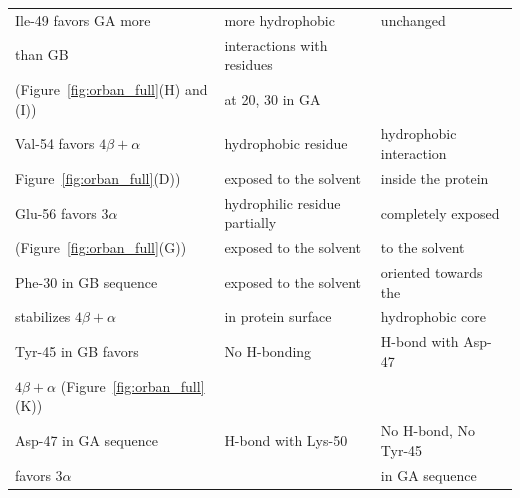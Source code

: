\documentclass[12pt]{article}
\begin{document}
\begin{table}
\begin{center}
\begin{tabular}{| l | l | l |}
    Ile-49 favors GA more                      & more hydrophobic               &  unchanged                                              \\
    than GB                                    & interactions with residues     &                                                         \\ 
    (Figure~\ref{fig:orban_full}(H) and (I))  &  at 20, 30 in GA                &                                                         \\ \hline
    Val-54 favors $4 \beta + \alpha$           & hydrophobic residue            & hydrophobic interaction                                \\
    Figure~\ref{fig:orban_full}(D))             & exposed to the solvent        & inside the protein                                      \\ \hline
    Glu-56 favors $3 \alpha$                   & hydrophilic residue partially  & completely exposed                                    \\
    (Figure~\ref{fig:orban_full}(G))            & exposed to the solvent         & to the solvent                                        \\ \hline
    Phe-30 in GB sequence                      & exposed to the solvent         & oriented towards the                                  \\
    stabilizes $4 \beta + \alpha$                  & in protein surface             & hydrophobic core                                      \\ \hline   
    Tyr-45 in GB favors                      & No H-bonding                   & H-bond with Asp-47                                    \\  
    $4 \beta + \alpha$ (Figure~\ref{fig:orban_full}(K))&                 &                                                       \\ \hline
    Asp-47 in GA sequence                      & H-bond with Lys-50             & No H-bond, No Tyr-45                                  \\  
    favors $3 \alpha$                          &                         & in GA sequence                                         \\ \hline
\end{tabular}
\end{center}
\end{table}
\end{document}
